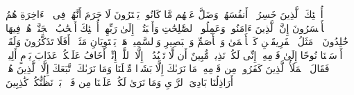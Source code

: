 \stopbuffer
\startbuffer[\q:11:21]
أُو۟لَٰۤئِكَ ٱلَّذِینَ خَسِرُوۤا۟ أَنفُسَهُمۡ وَضَلَّ عَنۡهُم مَّا كَانُوا۟ یَفۡتَرُونَ%
\stopbuffer
\startbuffer[\q:11:22]
لَا جَرَمَ أَنَّهُمۡ فِی ٱلۡءَاخِرَةِ هُمُ ٱلۡأَخۡسَرُونَ%
\stopbuffer
\startbuffer[\q:11:23]
إِنَّ ٱلَّذِینَ ءَامَنُوا۟ وَعَمِلُوا۟ ٱلصَّٰلِحَٰتِ وَأَخۡبَتُوۤا۟ إِلَىٰ رَبِّهِمۡ أُو۟لَٰۤئِكَ أَصۡحَٰبُ ٱلۡجَنَّةِۖ هُمۡ فِیهَا خَٰلِدُونَ%
\stopbuffer
\startbuffer[\q:11:24]
۞ مَثَلُ ٱلۡفَرِیقَیۡنِ كَٱلۡأَعۡمَىٰ وَٱلۡأَصَمِّ وَٱلۡبَصِیرِ وَٱلسَّمِیعِۚ هَلۡ یَسۡتَوِیَانِ مَثَلًاۚ أَفَلَا تَذَكَّرُونَ%
\stopbuffer
\startbuffer[\q:11:25]
وَلَقَدۡ أَرۡسَلۡنَا نُوحًا إِلَىٰ قَوۡمِهِۦۤ إِنِّی لَكُمۡ نَذِیرࣱ مُّبِینٌ%
\stopbuffer
\startbuffer[\q:11:26]
أَن لَّا تَعۡبُدُوۤا۟ إِلَّا ٱللَّهَۖ إِنِّیۤ أَخَافُ عَلَیۡكُمۡ عَذَابَ یَوۡمٍ أَلِیمࣲ%
\stopbuffer
\startbuffer[\q:11:27]
فَقَالَ ٱلۡمَلَأُ ٱلَّذِینَ كَفَرُوا۟ مِن قَوۡمِهِۦ مَا نَرَىٰكَ إِلَّا بَشَرࣰا مِّثۡلَنَا وَمَا نَرَىٰكَ ٱتَّبَعَكَ إِلَّا ٱلَّذِینَ هُمۡ أَرَاذِلُنَا بَادِیَ ٱلرَّأۡیِ وَمَا نَرَىٰ لَكُمۡ عَلَیۡنَا مِن فَضۡلِۭ بَلۡ نَظُنُّكُمۡ كَٰذِبِینَ%
\stopbuffer
